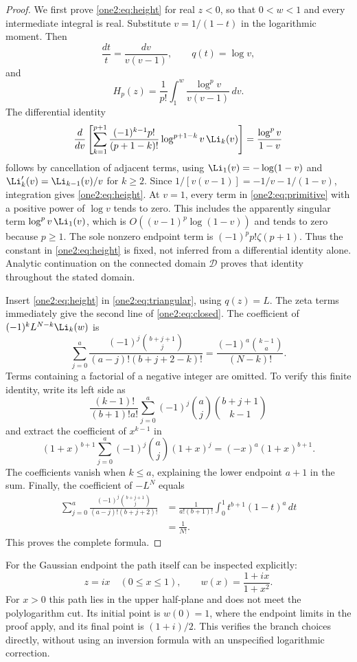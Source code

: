 \begin{proof}
We first prove \eqref{one2:eq:height} for real $z<0$, so that
$0<w<1$ and every intermediate integral is real.  Substitute
$v=1/(1-t)$ in the logarithmic moment.  Then
\[
 \frac{dt}{t}=\frac{dv}{v(v-1)},\qquad q(t)=\log v,
\]
and
\[
 H_p(z)=\frac1{p!}\int_1^w\frac{\log^p v}{v(v-1)}\,dv.
\]
The differential identity
\begin{equation}
 \frac{d}{dv}\left[
 \sum_{k=1}^{p+1}\frac{(-1)^{k-1}p!}{(p+1-k)!}
       \log^{p+1-k}v\,\Li_k(v)\right]
       =\frac{\log^p v}{1-v}
 \label{one2:eq:primitive}
\end{equation}
follows by cancellation of adjacent terms, using
$\Li_1(v)=-\log(1-v)$ and $\Li'_k(v)=\Li_{k-1}(v)/v$ for $k\ge2$.
Since
$1/[v(v-1)]=-1/v-1/(1-v)$, integration gives
\eqref{one2:eq:height}.  At $v=1$, every term in
\eqref{one2:eq:primitive} with a positive power of $\log v$ tends to
zero.  This includes the apparently singular term
$\log^p v\,\Li_1(v)$, which is
$O((v-1)^p\log(1-v))$ and tends to zero because $p\ge1$.
The sole nonzero endpoint term is $(-1)^pp!\zeta(p+1)$.
Thus the constant in \eqref{one2:eq:height} is fixed, not inferred
from a differential identity alone.  Analytic continuation on the
connected domain $\mathcal D$ proves that identity throughout the
stated domain.

Insert \eqref{one2:eq:height} in
\eqref{one2:eq:triangular}, using $q(z)=L$.  The zeta terms immediately
give the second line of \eqref{one2:eq:closed}.  The coefficient of
$(-1)^k L^{N-k}\Li_k(w)$ is
\[
 \sum_{j=0}^a\frac{(-1)^j\binom{b+j+1}{j}}
                    {(a-j)!(b+j+2-k)!}
 =\frac{(-1)^a\binom{k-1}{a}}{(N-k)!}.
\]
Terms containing a factorial of a negative integer are omitted.  To
verify this finite identity, write its left side as
\[
 \frac{(k-1)!}{(b+1)!a!}
 \sum_{j=0}^a(-1)^j\binom aj\binom{b+j+1}{k-1}
\]
and extract the coefficient of $x^{k-1}$ in
\[
 (1+x)^{b+1}\sum_{j=0}^a(-1)^j\binom aj(1+x)^j
   =(-x)^a(1+x)^{b+1}.
\]
The coefficients vanish when $k\le a$, explaining the lower endpoint
$a+1$ in the sum.  Finally, the coefficient of $-L^N$ equals
\begin{align*}
 \sum_{j=0}^a\frac{(-1)^j\binom{b+j+1}{j}}
                    {(a-j)!(b+j+2)!}
 &=\frac1{a!(b+1)!}\int_0^1t^{b+1}(1-t)^a\,dt\\
 &=\frac1{N!}.
\end{align*}
This proves the complete formula.
\end{proof}

For the Gaussian endpoint the path itself can be inspected explicitly:
\[
 z=ix\quad(0\le x\le1),\qquad
 w(x)=\frac{1+ix}{1+x^2}.
\]
For $x>0$ this path lies in the upper half-plane and does not meet the
polylogarithm cut.  Its initial point is $w(0)=1$, where the endpoint
limits in the proof apply, and its final point is $(1+i)/2$.  This
verifies the branch choices directly, without using an inversion
formula with an unspecified logarithmic correction.

